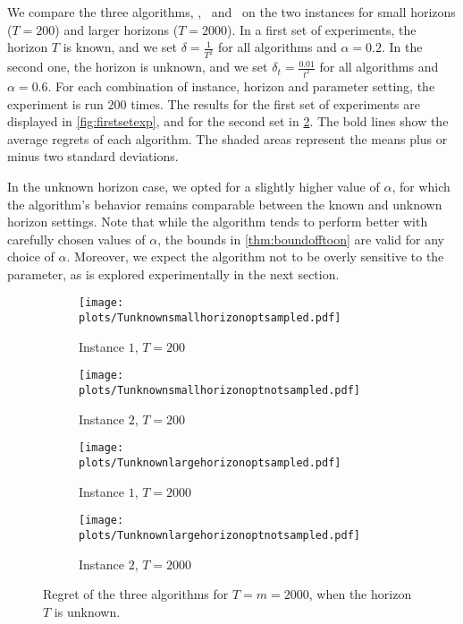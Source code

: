 We compare the three algorithms, \alglcb, \algucb\, and \algoname\, on the two instances for small horizons ($T=200$) and larger horizons ($T=2000$). In a first set of experiments, the horizon $T$ is known, and we set $\delta=\frac{1}{T^2}$ for all algorithms and $\alpha=0.2$. In the second one, the horizon is unknown, and we set $\delta_t= \frac{0.01}{t^2}$ for all algorithms and $\alpha=0.6$. For each combination of instance, horizon and parameter setting, the experiment is run $200$ times. The results for the first set of experiments are displayed in \cref{fig:firstsetexp}, and for the second set in \cref{fig:secondsetexp}. The bold lines show the average regrets of each algorithm. The shaded areas represent the means plus or minus two standard deviations.


In the unknown horizon case, we opted for a slightly higher value of $\alpha$,  for which the algorithm's behavior remains comparable between the known and unknown horizon settings. Note that while the algorithm tends to perform better with carefully chosen values of $\alpha$, the bounds in \cref{thm:boundofftoon} are valid for any choice of $\alpha$. Moreover, we expect the algorithm not to be overly sensitive to the parameter, as is explored experimentally in the next section.







\begin{figure}[htb]
\begin{centering}
\begin{subfigure}{.48\textwidth}
  \centering
  \texttt{[image: plots/Tunknownsmallhorizonoptsampled.pdf]}
  \caption{Instance $1$, $T=200$}
\end{subfigure}%
\begin{subfigure}{.48\textwidth}
  \centering
  \texttt{[image: plots/Tunknownsmallhorizonoptnotsampled.pdf]}
  \caption{Instance $2$, $T=200$}
\end{subfigure}
\begin{subfigure}{.48\textwidth}
  \centering
  \texttt{[image: plots/Tunknownlargehorizonoptsampled.pdf]}
  \caption{Instance $1$, $T=2000$}
\end{subfigure}%
\begin{subfigure}{.48\textwidth}
  \centering
  \texttt{[image: plots/Tunknownlargehorizonoptnotsampled.pdf]}
  \caption{Instance $2$, $T=2000$}\label{fig:largehorizonTunknown}
\end{subfigure}
\caption{Regret of the three algorithms for $T=m=2000$, when the horizon $T$ is unknown.}
\label{fig:secondsetexp}
\end{centering}
\end{figure}

